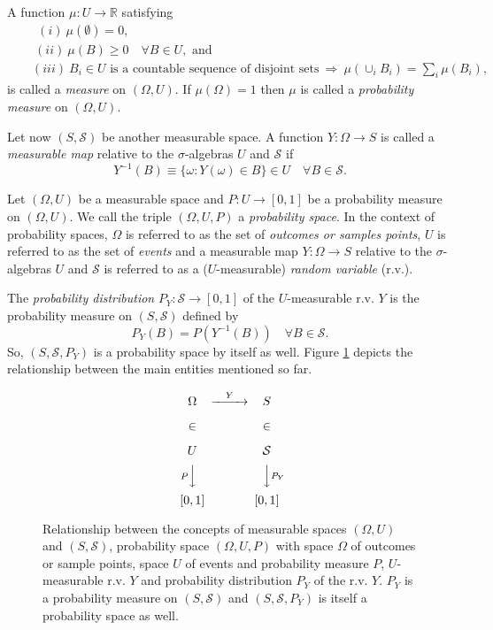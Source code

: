 A function $\mu:U\rightarrow\mathbb{R}$ satisfying
\begin{eqnarray*}
 & & ~~(i)~\mu(\emptyset) = 0, \\
 & & ~(ii)~\mu(B)\geqslant 0\quad\forall B\in U,\mbox{ and} \\
 & & (iii)~B_i\in U\mbox{ is a countable sequence of disjoint sets}~\Rightarrow~\mu(\cup_iB_i)=\sum_i \mu(B_i),
\end{eqnarray*}
is called a {\it measure} on $(\Omega,U)$. If $\mu(\Omega)=1$ then $\mu$ is called a {\it probability measure} on $(\Omega,U)$.

Let now $(S,\mathcal{S})$ be another measurable space.
A function $Y:\Omega\rightarrow S$ is called a {\it measurable map} relative to the $\sigma$-algebras $U$ and $\mathcal{S}$ if
\begin{equation*}
Y^{-1}(B)\equiv\{\omega: Y(\omega)\in B\}\in U\quad\forall B\in\mathcal{S}.
\end{equation*}

Let $(\Omega,U)$ be a measurable space and $P:U\rightarrow [0,1]$ be a probability measure on $(\Omega,U)$.
We call the triple $(\Omega,U,P)$ a {\it probability space}.
In the context of probability spaces,
$\Omega$ is referred to as the set of {\it outcomes or samples points},
$U$ is referred to as the set of {\it events} and
a measurable map $Y:\Omega\rightarrow S$ relative to the $\sigma$-algebras $U$ and $\mathcal{S}$ is referred to as a ($U$-measurable) {\it random variable} (r.v.).

The {\it probability distribution} $P_Y:\mathcal{S}\rightarrow [0,1]$ of the $U$-measurable r.v. $Y$
is the probability measure on $(S,\mathcal{S})$ defined by
\begin{equation*}
P_Y(B) = P(Y^{-1}(B))\quad\forall B\in\mathcal{S}.
\end{equation*}
So, $(S,\mathcal{S},P_Y)$ is a probability space by itself as well.
Figure \ref{fig-rv-diagram} depicts the relationship between the main entities mentioned so far.

\begin{figure}[h]
\[
\begin{CD}
\Omega   @>Y>> S           \\
\in      @.    \in         \\
U        @.    \mathcal{S} \\
@VP VV         @VVP_Y V    \\
[0,1]    @.    [0,1]
\end{CD}
\]
\caption{Relationship between the concepts of
measurable spaces $(\Omega,U)$ and $(S,\mathcal{S})$,
probability space $(\Omega,U,P)$ with
space $\Omega$ of outcomes or sample points,
space $U$ of events and
probability measure $P$,
$U$-measurable r.v. $Y$ and
probability distribution $P_Y$ of the r.v. $Y$.
$P_Y$ is a probability measure on $(S,\mathcal{S})$ and
$(S,\mathcal{S},P_Y)$ is itself a probability space as well.
}
\label{fig-rv-diagram}
\end{figure}

